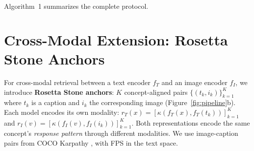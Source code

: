 \documentclass{article}
\begin{document}
Algorithm~1 summarizes the complete protocol.

\begin{figure}[t]
\centering
\small
{}
\label{alg:rat}
\end{figure}

\section{Cross-Modal Extension: Rosetta Stone Anchors}
\label{sec:rosetta}

For cross-modal retrieval between a text encoder $f_T$ and an image encoder $f_I$, we introduce \textbf{Rosetta Stone anchors}: $K$ concept-aligned pairs $\{(t_k, i_k)\}_{k=1}^K$ where $t_k$ is a caption and $i_k$ the corresponding image (Figure~\ref{fig:pipeline}b). Each model encodes its own modality: $r_T(x) = [\kappa(f_T(x), f_T(t_k))]_{k=1}^K$ and $r_I(v) = [\kappa(f_I(v), f_I(i_k))]_{k=1}^K$. Both representations encode the same concept's \emph{response pattern} through different modalities. We use image-caption pairs from COCO Karpathy \citep{lin2014microsoft,karpathy2015deep}, with FPS in the text space.
\end{document}
